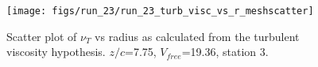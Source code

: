 \begin{figure}[H]
\centering
\texttt{[image: figs/run\_23/run\_23\_turb\_visc\_vs\_r\_meshscatter]}
\caption{Scatter plot of $\nu_T$ vs radius as calculated from the turbulent viscosity hypothesis. $z/c$=7.75, $V_{free}$=19.36, station 3.}
\label{fig:run_23_turb_visc_vs_r_meshscatter}
\end{figure}


